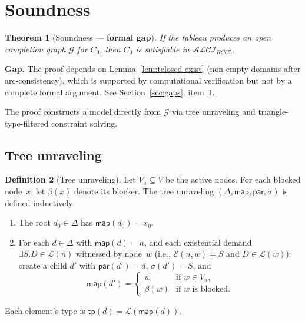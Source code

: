 \documentclass[a4paper,11pt]{article}
\newtheorem{theorem}{Theorem}[section]
\theoremstyle{definition}
\newtheorem{definition}[theorem]{Definition}
\newcommand{\ALCIRCC}[1]{\ensuremath{\mathcal{ALCI}_{\mathit{RCC#1}}}}
\newcommand{\tp}{\ensuremath{\mathsf{tp}}}
\newcommand{\GG}{\ensuremath{\mathcal{G}}}
\newcommand{\LL}{\ensuremath{\mathcal{L}}}
\newcommand{\EE}{\ensuremath{\mathcal{E}}}
\begin{document}
\section{Soundness}\label{sec:soundness}

\begin{theorem}[Soundness --- \textbf{formal gap}]\label{thm:soundness}
If the tableau produces an open completion graph $\GG$ for
$C_0$, then $C_0$ is satisfiable in $\ALCIRCC{5}$.
\end{theorem}

\noindent
\textbf{Gap.}\; The proof depends on
Lemma~\ref{lem:tclosed-exist} (non-empty domains after
arc-consistency), which is supported by computational
verification but not by a complete formal argument.
See Section~\ref{sec:gaps}, item~1.

\medskip
The proof constructs a model directly from $\GG$ via tree
unraveling and triangle-type-filtered constraint solving.

\subsection{Tree unraveling}\label{sec:unraveling}

\begin{definition}[Tree unraveling]\label{def:unrav}
Let $V_a \subseteq V$ be the active nodes.  For each blocked
node~$x$, let $\beta(x)$ denote its blocker.  The tree
unraveling $(\Delta, \mathsf{map}, \mathsf{par}, \sigma)$ is
defined inductively:
\begin{enumerate}[nosep]
  \item The root $d_0 \in \Delta$ has $\mathsf{map}(d_0) = x_0$.
  \item For each $d \in \Delta$ with $\mathsf{map}(d) = n$,
    and each existential demand $\exists S.D \in \LL(n)$
    witnessed by node~$w$ (i.e.,
    $\EE(n, w) = S$ and $D \in \LL(w)$): create a child $d'$
    with $\mathsf{par}(d') = d$, $\sigma(d') = S$, and
    \[
    \mathsf{map}(d') = \begin{cases}
      w & \text{if } w \in V_a, \\
      \beta(w) & \text{if } w \text{ is blocked.}
    \end{cases}
    \]
\end{enumerate}
Each element's type is $\tp(d) = \LL(\mathsf{map}(d))$.
\end{definition}
\end{document}
